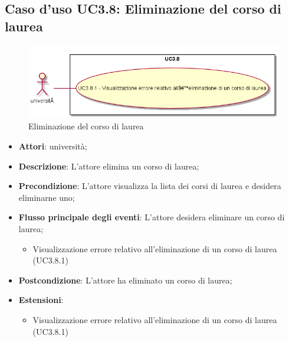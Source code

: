 \subsection{Caso d'uso \texorpdfstring{UC3.8}{UC3.8}: Eliminazione del corso di laurea}
\begin{figure} [H]
\centering
\includegraphics[scale=0.45]{./img/UC3-8.png}
\caption{Eliminazione del corso di laurea}\label{}
\end{figure}
\begin{itemize}
\item \textbf{Attori}: università;
\item \textbf{Descrizione}: L'attore elimina un corso di laurea;

\item \textbf{Precondizione}: L'attore visualizza la lista dei corsi di laurea e desidera eliminarne uno;

\item \textbf{Flusso principale degli eventi}: L'attore desidera eliminare un corso di laurea;

\begin{itemize}
\item Visualizzazione errore relativo all’eliminazione di un corso di laurea (UC3.8.1)
\end{itemize}
\item \textbf{Postcondizione}: L'attore ha eliminato un corso di laurea;

\item \textbf{Estensioni}:
\begin{itemize}
\item Visualizzazione errore relativo all’eliminazione di un corso di laurea (UC3.8.1)
\end{itemize}
\end{itemize}
